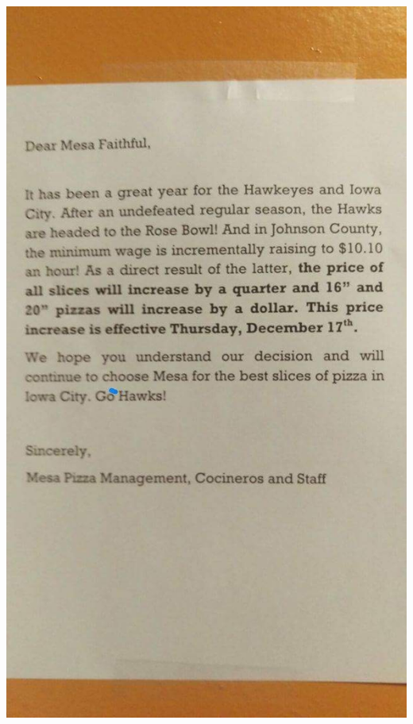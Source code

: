 \documentclass[xcolor=table]{beamer}
\begin{document}
\begin{spacing}{1.2}
\begin{frame}
\includegraphics[scale=.15]{mesa.jpg}
\end{frame}
%
%
%
%
%

\end{spacing}
\end{document}
